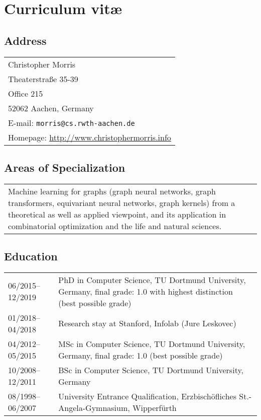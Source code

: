 \documentclass[11pt, a4paper, DIV=14, headings=small]{scrartcl}
\begin{document}
	
	\section*{\textcolor{upmaroon}{\large Curriculum vitæ}}
	\vspace{-20pt}
	\hrulefill
	\subsection*{Address}
	\noindent
	\begin{tabular}{l}
		Christopher Morris                                \\
		Theaterstraße 35-39                               \\
		Office 215                                        \\
		52062 Aachen, Germany                             \\
		E-mail: \texttt{{morris@cs.rwth-aachen.de}}       \\
		Homepage: \url{http://www.christophermorris.info} \\
	\end{tabular}
		\renewcommand{\arraystretch}{1.3}
	\subsection*{Areas of Specialization}
	\noindent
	\begin{tabular}{p{15.0cm}}
		Machine learning for graphs (graph neural networks, graph transformers, equivariant neural networks, graph kernels) from a theoretical as well as applied viewpoint, and its application in combinatorial optimization and the life and natural sciences.
	\end{tabular}
	
	\subsection*{Education}
	\noindent
	\begin{tabular}{p{3.0cm}p{11.5cm}}
		06/2015--12/2019 & PhD in Computer Science, TU Dortmund University, Germany, final grade: 1.0 with highest distinction  (best possible grade) \\
		01/2018--04/2018 & Research stay at Stanford, Infolab (Jure Leskovec)                                                                         \\
		04/2012--05/2015 & MSc in Computer Science, TU Dortmund University, Germany, final grade: 1.0 (best possible grade)                           \\
		10/2008--12/2011 & BSc in Computer Science, TU Dortmund University, Germany                                                                   \\
		08/1998--06/2007 & University Entrance Qualification, Erzbisch\"ofliches St.-Angela-Gymnasium, Wipperf\"urth                                  \\
	\end{tabular}
	
\end{document}
